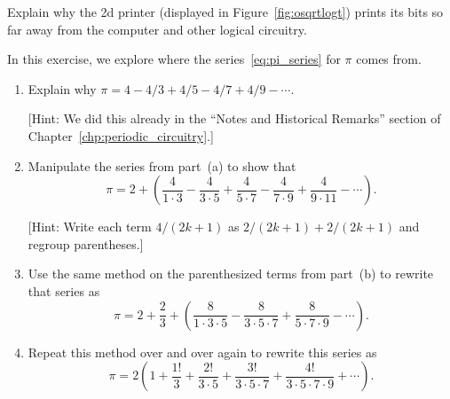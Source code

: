 \begin{multicols}{2}
\mfilbreak


\begin{problem}\label{exer:universal_computation_b2d_why_far}
	Explain why the 2d printer (displayed in Figure~\ref{fig:osqrtlogt}) prints its bits so far away from the computer and other logical circuitry.
	
\end{problem}


\mfilbreak


\begin{problemstar}\label{exer:universal_computation_derive_pi_series}
	In this exercise, we explore where the series~\eqref{eq:pi_series} for $\pi$ comes from.\smallskip
	
	\begin{enumerate}[label=\bf\color{ocre}(\alph*)]
		\item Explain why $\pi = 4 - 4/3 + 4/5 - 4/7 + 4/9 - \cdots$.
		
		[Hint: We did this already in the ``Notes and Historical Remarks'' section of Chapter~\ref{chp:periodic_circuitry}.]
		
		\item Manipulate the series from part~(a) to show that
		\[
			\pi = 2 + \left(\frac{4}{1\cdot 3} - \frac{4}{3\cdot 5} + \frac{4}{5\cdot 7} - \frac{4}{7\cdot 9} + \frac{4}{9\cdot 11} - \cdots\right).
		\]
		
		[Hint: Write each term $4/(2k+1)$ as $2/(2k+1) + 2/(2k+1)$ and regroup parentheses.]
		
		\item Use the same method on the parenthesized terms from part~(b) to rewrite that series as
		\[
			\pi = 2 + \frac{2}{3} + \left(\frac{8}{1\cdot 3 \cdot 5} - \frac{8}{3\cdot 5 \cdot 7} + \frac{8}{5\cdot 7 \cdot 9} - \cdots\right).
		\]
		
		\item Repeat this method over and over again to rewrite this series as
		\[
			\pi = 2\left(1 + \frac{1!}{3} + \frac{2!}{3\cdot 5} + \frac{3!}{3\cdot 5 \cdot 7} + \frac{4!}{3 \cdot 5 \cdot 7 \cdot 9} + \cdots\right).
		\]
		

\end{enumerate}
\end{problemstar}
\end{multicols}
